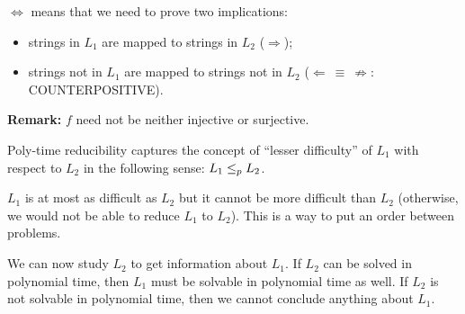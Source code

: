 $\Longleftrightarrow$ means that we need to prove two implications:
\begin{itemize}
\item strings in $L_1$ are mapped to strings in $L_2$ ($\Rightarrow$);
\item strings not in $L_1$ are mapped to strings not in $L_2$ ($\Leftarrow\ \equiv\ \not\Rightarrow$: COUNTERPOSITIVE).
\end{itemize}

\textbf{Remark:} $f$ need not be neither injective or surjective.

Poly-time reducibility captures the concept of ``lesser difficulty'' of $L_1$ with respect to $L_2$ in the following sense: $L_1\leq_p L_2$. 

 $L_1$ is at most as difficult as $L_2$ but it cannot be more difficult than $L_2$ (otherwise, we would not be able to reduce $L_1$ to $L_2$). This is a way to put an order between problems. 

 We can now study $L_2$ to get information about $L_1$. If  $L_2$ can be solved in polynomial time, then $L_1$ must be solvable in polynomial time as well. If $L_2$ is not solvable in polynomial time, then we cannot conclude anything about $L_1$.


